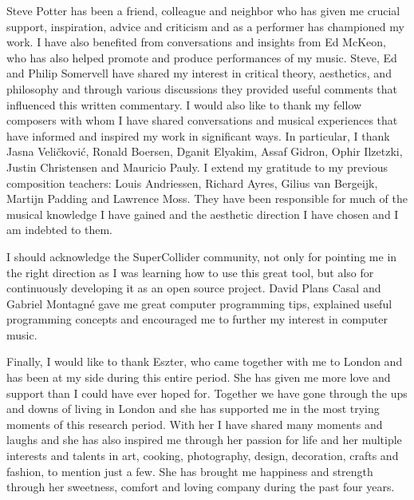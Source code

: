 Steve Potter has been a friend, colleague and neighbor who has given me crucial support, inspiration, advice and criticism and as a performer has championed my work. I have also benefited from conversations and insights from Ed McKeon, who has also helped promote and produce performances of my music. Steve, Ed and Philip Somervell have shared my interest in critical theory, aesthetics, and philosophy and through various discussions they provided useful comments that influenced this written commentary. I would also like to thank my fellow composers with whom I have shared conversations and musical experiences that have informed and inspired my work in significant ways. In particular, I thank Jasna Veli\v{c}kovi\'{c}, Ronald Boersen, Dganit Elyakim, Assaf Gidron, Ophir Ilzetzki, Justin Christensen and Mauricio Pauly. I extend my gratitude to my previous composition teachers: Louis Andriessen, Richard Ayres, Gilius van Bergeijk, Martijn Padding and Lawrence Moss. They have been responsible for much of the musical knowledge I have gained and the aesthetic direction I have chosen and I am indebted to them.

I should acknowledge the SuperCollider community, not only for pointing me in the right direction as I was learning how to use this great tool, but also for continuously developing it as an open source project. David Plans Casal and Gabriel Montagn\'e gave me great computer programming tips, explained useful programming concepts and encouraged me to further my interest in computer music.

Finally, I would like to thank Eszter, who came together with me to London and has been at my side during this entire period. She has given me more love and support than I could have ever hoped for. Together we have gone through the ups and downs of living in London and she has supported me in the most trying moments of this research period. With her I have shared many moments and laughs and she has also inspired me through her passion for life and her multiple interests and talents in art, cooking, photography, design, decoration, crafts and fashion, to mention just a few. She has brought me happiness and strength through her sweetness, comfort and loving company during the past four years.  
